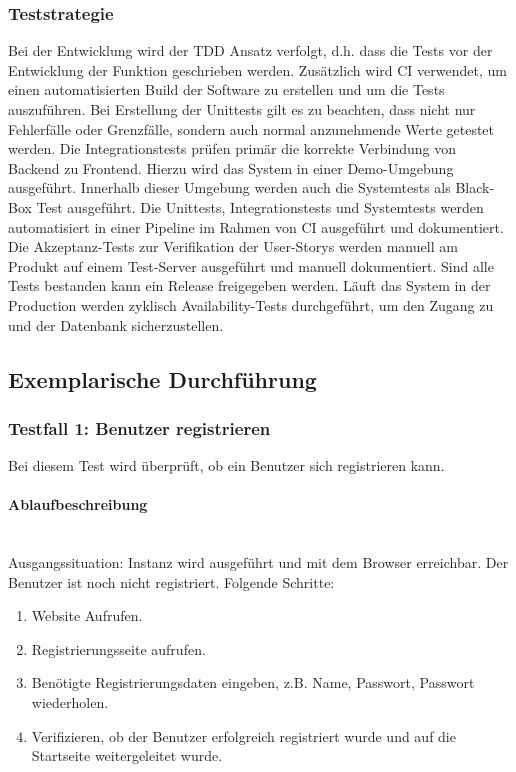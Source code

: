 \subsubsection*{Teststrategie}
Bei der Entwicklung wird der \ac{TDD} Ansatz verfolgt, d.h. dass die Tests vor der Entwicklung der Funktion geschrieben werden.
Zusätzlich wird \ac{CI} verwendet, um einen automatisierten Build der Software zu erstellen und um die Tests auszuführen.
Bei Erstellung der Unittests gilt es zu beachten, dass nicht nur Fehlerfälle oder Grenzfälle, sondern auch normal anzunehmende Werte getestet werden.
Die Integrationstests prüfen primär die korrekte Verbindung von Backend zu Frontend.
Hierzu wird das System in einer Demo-Umgebung ausgeführt.
Innerhalb dieser Umgebung werden auch die Systemtests als Black-Box Test ausgeführt.
\newparagraph
Die Unittests, Integrationstests und Systemtests werden automatisiert in einer Pipeline im Rahmen von \ac{CI} ausgeführt und dokumentiert.
Die Akzeptanz-Tests zur Verifikation der User-Storys werden manuell am Produkt auf einem Test-Server ausgeführt und manuell dokumentiert. 
Sind alle Tests bestanden kann ein Release freigegeben werden.
Läuft das System in der Production werden zyklisch Availability-Tests durchgeführt, um den Zugang zu  und der Datenbank sicherzustellen.
\subsection{Exemplarische Durchführung}
\subsubsection{Testfall 1: Benutzer registrieren}
Bei diesem Test wird überprüft, ob ein Benutzer sich registrieren kann.
\paragraph{Ablaufbeschreibung} \mbox{}\\
Ausgangssituation: Instanz wird ausgeführt und mit dem Browser erreichbar. Der Benutzer ist noch nicht registriert. Folgende Schritte:

\begin{enumerate}
  \item Website Aufrufen.
  \item Registrierungsseite aufrufen.
  \item Benötigte Registrierungsdaten eingeben, z.B. Name, Passwort, Passwort wiederholen.
  \item Verifizieren, ob der Benutzer erfolgreich registriert wurde und auf die Startseite weitergeleitet wurde.
\end{enumerate}

